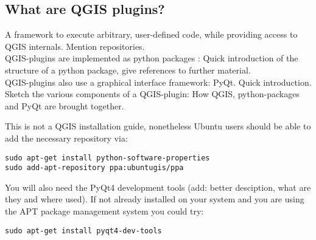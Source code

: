 \subsection{What are QGIS plugins?}
\par
A framework to execute arbitrary, user-defined code, while providing access to QGIS internals. Mention repositories.\\
QGIS-plugins are implemented as python packages : Quick introduction of the structure of a python package, give references to further material.\\
QGIS-plugins also use a graphical interface framework: PyQt. Quick introduction.\\
Sketch the various components of a QGIS-plugin: How QGIS, python-packages and PyQt are brought together.

This is not a QGIS installation guide, nonetheless Ubuntu users should be able to add the necessary repository via:
\begin{lstlisting}
sudo apt-get install python-software-properties
sudo add-apt-repository ppa:ubuntugis/ppa
\end{lstlisting}

You will also need the PyQt4 development tools (add: better desciption, what are they and where used). If not already installed on your system and you are using the APT package management system you could try:
\begin{lstlisting}
sudo apt-get install pyqt4-dev-tools
\end{lstlisting}
